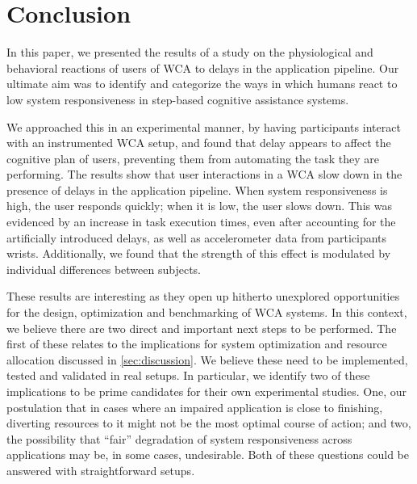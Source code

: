 \documentclass[10pt,letterpaper]{article}
\begin{document}
\section{Conclusion}\label{sec:conclusion}

In this paper, we presented the results of a study on the physiological and behavioral reactions of users of WCA to delays in the application pipeline.
Our ultimate aim was to identify and categorize the ways in which humans react to low system responsiveness in step-based cognitive assistance systems.

We approached this in an experimental manner, by having participants interact with an instrumented WCA setup, and found that delay appears to affect the cognitive plan of users, preventing them from automating the task they are performing.
The results show that user interactions in a WCA slow down in the presence of delays in the application pipeline.
When system responsiveness is high, the user responds quickly; when it is low, the user slows down.
This was evidenced by an increase in task execution times, even after accounting for the artificially introduced delays, as well as accelerometer data from participants wrists.
Additionally, we found that the strength of this effect is modulated by individual differences between subjects.

These results are interesting as they open up hitherto unexplored opportunities for the design, optimization and benchmarking of WCA systems.
In this context, we believe there are two direct and important next steps to be performed.
The first of these relates to the implications for system optimization and resource allocation discussed in \cref{sec:discussion}.
We believe these need to be implemented, tested and validated in real setups.
In particular, we identify two of these implications to be prime candidates for their own experimental studies.
One, our postulation that in cases where an impaired application is close to finishing, diverting resources to it might not be the most optimal course of action; and two, the possibility that ``fair'' degradation of system responsiveness across applications may be, in some cases, undesirable.
Both of these questions could be answered with straightforward setups.
\end{document}
